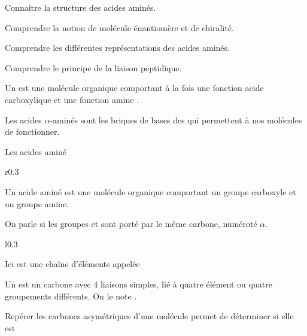 \teteTermStssBiom

\vspace*{-40pt}

\begin{objectifs}
  \item Connaître la structure des acides aminés.
  \item Comprendre la notion de molécule énantiomère et de chiralité.
  \item Comprendre les différentes représentations des acides aminés.
  \item Comprendre le principe de la liaison peptidique.
\end{objectifs}

\begin{contexte}
  Un  est une molécule organique comportant à la fois une fonction acide carboxylique  et une fonction amine .

  Les acides $\alpha$-aminés sont les briques de bases des  qui permettent à nos molécules de fonctionner. 
  
\end{contexte}


\begin{doc}{Les acides aminé}
  \begin{wrapfigure}[3]{r}{0.3\linewidth}
    \centering
    \vspace*{-24pt}
  \end{wrapfigure}
  Un acide aminé est une molécule organique comportant un groupe carboxyle et un groupe amine.

  \begin{importants}
    On parle  si les groupes  et  sont porté par le même carbone, numéroté $\alpha$.
  \end{importants}
  
  \begin{wrapfigure}{l}{0.3\linewidth}
    \centering
    \vspace*{-10pt}
  \end{wrapfigure}

  Ici  est une chaîne d'éléments appelée 
  
  \begin{importants}  
    Un  est un carbone avec 4 liaisons simples, lié à quatre élément ou quatre groupements différents.
    On le note .
  \end{importants}

  Repérer les carbones asymétriques d'une molécule permet de déterminer si elle est 
\end{doc}

